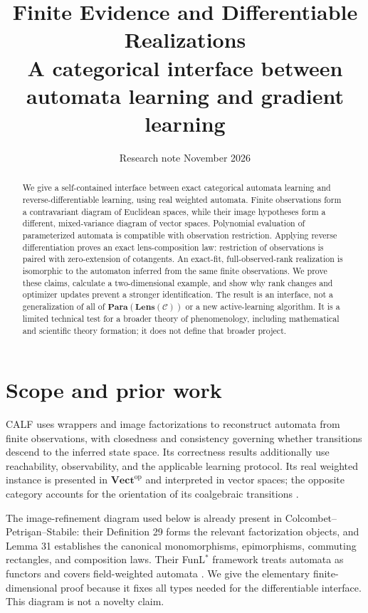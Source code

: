 \documentclass[11pt]{article}
\title{Finite Evidence and Differentiable Realizations\\
\large A categorical interface between automata learning and gradient learning}
\author{}
\date{Research note \quad 4 November 2026}
\theoremstyle{definition}
\newcommand{\Lens}{\mathbf{Lens}}
\newcommand{\Para}{\mathbf{Para}}
\begin{document}
\maketitle

\begin{abstract}
We give a self-contained interface between exact categorical automata learning and
reverse-differentiable learning, using real weighted automata. Finite observations
form a contravariant diagram of Euclidean spaces, while their image hypotheses
form a different, mixed-variance diagram of vector spaces. Polynomial evaluation
of parameterized automata is compatible with observation restriction. Applying
reverse differentiation proves an exact lens-composition law: restriction of
observations is paired with zero-extension of cotangents. An exact-fit,
full-observed-rank realization is isomorphic to the automaton inferred from the
same finite observations. We prove these claims, calculate a two-dimensional
example, and show why rank changes and optimizer updates prevent a stronger
identification. The result is an interface, not a generalization of all of
$\Para(\Lens(\mathcal C))$ or a new active-learning algorithm. It is a limited
technical test for a broader theory of phenomenology, including mathematical
and scientific theory formation; it does not define that broader project.
\end{abstract}

\section{Scope and prior work}

CALF uses wrappers and image factorizations to reconstruct automata from finite
observations, with closedness and consistency governing whether transitions
descend to the inferred state space. Its correctness results additionally use
reachability, observability, and the applicable learning protocol. Its real
weighted instance is presented in $\mathbf{Vect}^{\mathrm{op}}$ and interpreted
in vector spaces; the opposite category accounts for the orientation of its
coalgebraic transitions \cite{calf}.

The image-refinement diagram used below is already present in
Colcombet--Petri\c{s}an--Stabile: their Definition 29 forms the relevant
factorization objects, and Lemma 31 establishes the canonical monomorphisms,
epimorphisms, commuting rectangles, and composition laws. Their FunL$^*$
framework treats automata as functors and covers field-weighted automata
\cite{cps}. We give the elementary finite-dimensional proof because it fixes all
types needed for the differentiable interface. This diagram is not a novelty
claim.
\end{document}
